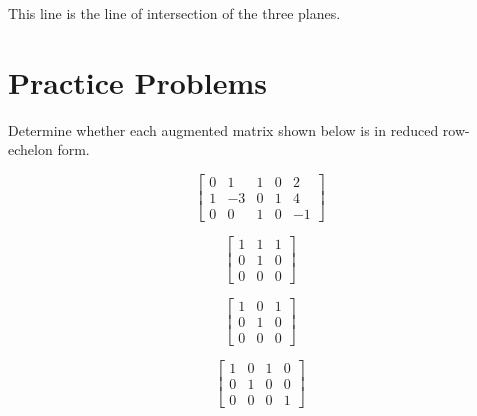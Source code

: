 \documentclass{ximera}
\begin{document}
\begin{example}
\begin{explanation}
  This line is the line of intersection of the three planes.
 \end{explanation}
 \end{example}

\section*{Practice Problems}
\begin{problem}
Determine whether each augmented matrix shown below is in reduced row-echelon form.
  \begin{problem}\label{prob:rrefmultchoice1}
  $$\left[\begin{array}{cccc|c}  
 0&1&1&0&2\\1&-3&0&1&4\\0&0&1&0&-1
 \end{array}\right]$$
 \begin{multipleChoice}
 \end{multipleChoice}
  \end{problem}
  
   \begin{problem}\label{prob:rrefmultchoice2}
  $$\left[\begin{array}{cc|c}  
 1&1&1\\0&1&0\\0&0&0
 \end{array}\right]$$
 \begin{multipleChoice}
 \end{multipleChoice}
  \end{problem}
  
  \begin{problem}\label{prob:rrefmultchoice3}
  $$\left[\begin{array}{cc|c}  
 1&0&1\\0&1&0\\0&0&0
 \end{array}\right]$$
 \begin{multipleChoice}
 \end{multipleChoice}
  \end{problem}
  
  \begin{problem}\label{prob:rrefmultchoice4}
  $$\left[\begin{array}{ccc|c}  
 1&0&1&0\\0&1&0&0\\0&0&0&1
 \end{array}\right]$$
 \begin{multipleChoice}
 \end{multipleChoice}
  \end{problem}
  

\end{problem}
\end{document}

